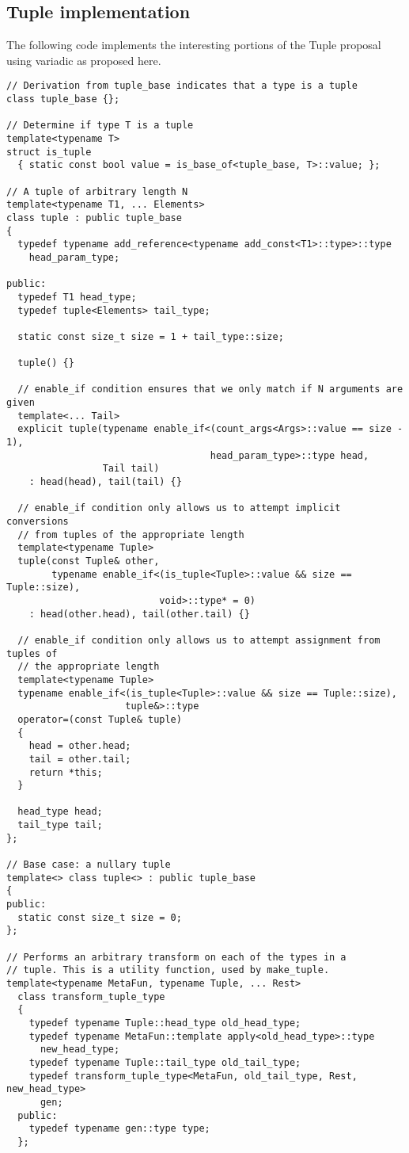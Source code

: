 \documentclass{article}
\begin{document}
\subsection{Tuple implementation}
\label{tupleimpl}
The following code implements the interesting portions of the Tuple
proposal~\cite{Jarvi02} using variadic as proposed here. 

\small
\begin{verbatim}
// Derivation from tuple_base indicates that a type is a tuple
class tuple_base {};

// Determine if type T is a tuple
template<typename T>
struct is_tuple
  { static const bool value = is_base_of<tuple_base, T>::value; };

// A tuple of arbitrary length N
template<typename T1, ... Elements>
class tuple : public tuple_base 
{
  typedef typename add_reference<typename add_const<T1>::type>::type
    head_param_type;

public:
  typedef T1 head_type;
  typedef tuple<Elements> tail_type;

  static const size_t size = 1 + tail_type::size;

  tuple() {}

  // enable_if condition ensures that we only match if N arguments are given
  template<... Tail> 
  explicit tuple(typename enable_if<(count_args<Args>::value == size - 1),
                                    head_param_type>::type head,
                 Tail tail)
    : head(head), tail(tail) {}

  // enable_if condition only allows us to attempt implicit conversions
  // from tuples of the appropriate length
  template<typename Tuple>
  tuple(const Tuple& other,
        typename enable_if<(is_tuple<Tuple>::value && size == Tuple::size), 
                           void>::type* = 0)
    : head(other.head), tail(other.tail) {}

  // enable_if condition only allows us to attempt assignment from tuples of
  // the appropriate length
  template<typename Tuple>
  typename enable_if<(is_tuple<Tuple>::value && size == Tuple::size),
                     tuple&>::type
  operator=(const Tuple& tuple)
  {
    head = other.head;
    tail = other.tail;
    return *this;
  }

  head_type head;
  tail_type tail;
};

// Base case: a nullary tuple
template<> class tuple<> : public tuple_base 
{
public:
  static const size_t size = 0;
};

// Performs an arbitrary transform on each of the types in a
// tuple. This is a utility function, used by make_tuple.
template<typename MetaFun, typename Tuple, ... Rest>
  class transform_tuple_type
  {
    typedef typename Tuple::head_type old_head_type;
    typedef typename MetaFun::template apply<old_head_type>::type
      new_head_type;
    typedef typename Tuple::tail_type old_tail_type;
    typedef transform_tuple_type<MetaFun, old_tail_type, Rest, new_head_type>
      gen;
  public:
    typedef typename gen::type type;
  };


\end{verbatim}
\end{document}
